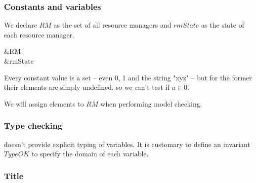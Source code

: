 
\begin{frame}
    \frametitle{Constants and variables}

    We declare $RM$ as the set of all resource managers and $rmState$ as the
    state of each resource manager.
    \begin{tlabox}
        &\CONSTANT RM \\
        &\VARIABLE rmState
    \end{tlabox}

    Every constant value is a set -- even 0, 1 and the string "xyz" --
    but for the former their elements are simply undefined, so we
    can't test if $a \in 0$.

    We will assign elements to $RM$ when performing model checking.
\end{frame}

\begin{frame}
    \frametitle{Type checking}
    \tlap doesn't provide explicit typing of variables. It is customary to
    define an invariant $TypeOK$ to specify the \alert{domain} of each variable.
    

\end{frame}


\begin{frame}
    \frametitle{Title}

    \begin{center} 
    \end{center}

\end{frame}
